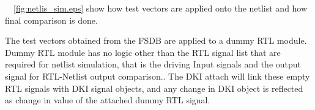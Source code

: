 ~\figurename{~\ref{fig:netlis_sim.eps}} show how test vectors are applied onto the netlist and how final comparison is done.

The test vectors obtained from the FSDB are applied to a dummy RTL module. Dummy RTL module has no logic other than the RTL signal list that are required for netlist simulation, that is the driving Input signals and the output signal for RTL-Netlist output comparison.. The DKI attach will link these empty RTL signals with DKI signal objects, and any change in DKI object is reflected as change in value of the attached dummy RTL signal.




%


